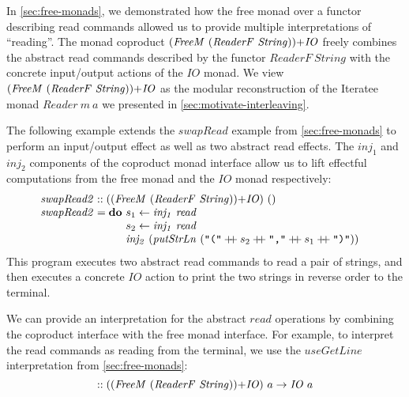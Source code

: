 \documentclass{jfp1}
\newcommand{\fmext}[1]{\langle\kern-0.25em\langle #1 \rangle\kern-0.25em\rangle}
\newcommand{\kw}[1]{\textbf{#1}}
\begin{document}
In \autoref{sec:free-monads}, we demonstrated how the free monad over
a functor describing read commands allowed us to provide multiple
interpretations of ``reading''. 
The monad coproduct
$(\mathit{FreeM}~(\mathit{ReaderF}~\mathit{String}))\mathord{+}\mathit{IO}$
freely combines the abstract read commands described by the functor
$\mathit{ReaderF}~\mathit{String}$ with the concrete input/output
actions of the $\mathit{IO}$ monad. We view
$(\mathit{FreeM}~(\mathit{ReaderF}~\mathit{String}))\mathord{+}\mathit{IO}$
as the modular reconstruction of the Iteratee monad
$\mathit{Reader}~m~a$ we presented in
\autoref{sec:motivate-interleaving}.

The following example extends the $\mathit{swapRead}$ example from
\autoref{sec:free-monads} to perform an input/output effect as well as
two abstract read effects.  The $\mathit{inj_1}$ and $\mathit{inj_2}$
components of the coproduct monad interface allow us to lift effectful
computations from the free monad and the $\mathit{IO}$ monad respectively:
\begin{displaymath}
  \begin{array}{@{}l}
    \mathit{swapRead2} :: (\cprd{(\mathit{FreeM}~(\mathit{ReaderF}~\mathit{String}))}{\mathit{IO}})~() \\
    \mathit{swapRead2} = \kw{do}~
    \begin{array}[t]{@{}l}
      s_1 \leftarrow \mathit{inj_1}~\mathit{read} \\
      s_2 \leftarrow \mathit{inj_1}~\mathit{read} \\
      \mathit{inj_2}~(\mathit{putStrLn}~(\texttt{"("} \dplus s_2 \dplus \texttt{","} \dplus s_1 \dplus \texttt{")"}))
    \end{array}
  \end{array}
\end{displaymath}
This program executes two abstract read commands to read a pair of
strings, and then executes a concrete $\mathit{IO}$ action to print
the two strings in reverse order to the terminal.

We can provide an interpretation for the abstract $\mathit{read}$
operations by combining the coproduct interface with the free monad
interface. For example, to interpret the read commands as reading from
the terminal, we use the $\mathit{useGetLine}$ interpretation from
\autoref{sec:free-monads}:
\begin{displaymath}
  [\fmext{\mathit{useGetLine}}, \mathit{id}] :: (\cprd{(\mathit{FreeM}~(\mathit{ReaderF}~\mathit{String}))}{\mathit{IO}})~a \to \mathit{IO}~a
\end{displaymath}
\end{document}

